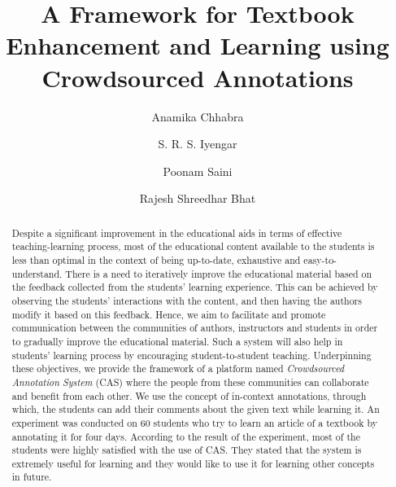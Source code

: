 \documentclass{llncs}
\begin{document}
\title{A Framework for Textbook Enhancement and Learning using Crowdsourced Annotations}


\author{Anamika Chhabra \and S. R. S. Iyengar \and Poonam Saini \and Rajesh Shreedhar Bhat }

\maketitle

\begin{abstract}

Despite a significant improvement in the educational aids in terms of effective teaching-learning process, most of the educational content available to the students is less than optimal in the context of being up-to-date, exhaustive and easy-to-understand. There is a need to iteratively improve the educational material based on the feedback collected from the students' learning experience. This can be achieved by observing the students' interactions with the content, and then having the authors modify it based on this feedback. Hence, we aim to facilitate and promote communication between the communities of authors, instructors and students in order to gradually improve the educational material. Such a system will also help in students' learning process by encouraging student-to-student teaching. Underpinning these objectives, we provide the framework of a platform named \textit{Crowdsourced Annotation System} (CAS) where the people from these communities can collaborate and benefit from each other. We use the concept of in-context annotations, through which, the students can add their comments about the given text while learning it. An experiment was conducted on 60 students who try to learn an article of a textbook by annotating it for four days. According to the result of the experiment, most of the students were highly satisfied with the use of CAS. They stated that the system is extremely useful for learning and they would like to use it for learning other concepts in future. 

\end{abstract}
\end{document}
